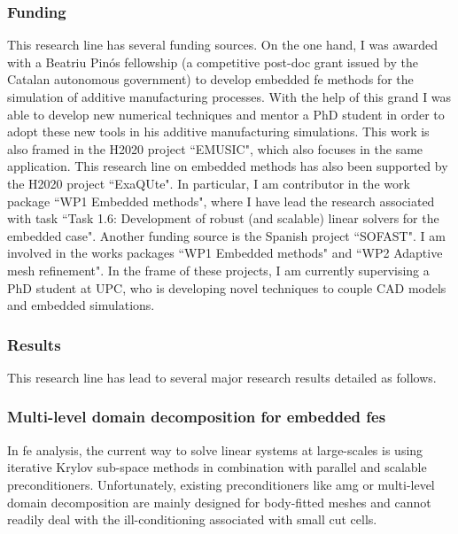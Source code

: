 \documentclass{article}
\begin{document}
\subsubsection{Funding}

This research line has several funding sources. On the one hand, I was awarded with a Beatriu Pinós fellowship (a competitive post-doc grant issued by the Catalan autonomous government) to develop embedded \ac{fe} methods for the simulation of additive manufacturing processes. With the help of this grand I was able to develop new numerical techniques and mentor a PhD student in order to adopt these new tools in his additive manufacturing simulations. This work is also framed in the  H2020 project ``EMUSIC", which also focuses in the same application.  This research line  on embedded methods has also been supported by the  H2020 project ``ExaQUte". In particular, I am contributor in the work package ``WP1 Embedded methods", where I have lead the research associated with task ``Task 1.6: Development of robust (and scalable) linear solvers for the embedded case". Another funding source is the Spanish project  ``SOFAST".  I am involved in the works packages ``WP1 Embedded methods" and ``WP2 Adaptive mesh refinement". In the frame of these projects, I am currently supervising a PhD student at UPC, who is developing novel techniques to couple CAD models and embedded simulations.


\subsubsection{Results}

This research line has lead to several major research results detailed as follows.

\subsubsection{Multi-level domain decomposition for embedded \acp{fe}} \label{sec:unf-BDDC}

In \ac{fe} analysis, the current way to solve linear systems at large-scales is using iterative Krylov sub-space methods in combination with parallel and scalable preconditioners. Unfortunately, existing preconditioners like \ac{amg} \cite{briggs_2000} or multi-level domain decomposition \cite{toselli_2005} are mainly designed for body-fitted meshes and cannot readily deal with the ill-conditioning associated with small cut cells. 
\end{document}
